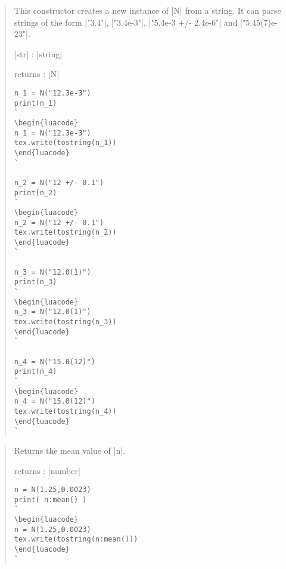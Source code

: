 \documentclass{ltxdoc}
\begin{document}
\begin{quote}
  This constructor creates a new instance of |N| from a string. It can parse strings of the form |"3.4"|, |"3.4e-3"|, |"5.4e-3 +/- 2.4e-6"| and |"5.45(7)e-23"|. 

  \begin{description}
  \item |str| : |string|

  \item returns : |N|
  \end{description}

\begin{lstlisting}
n_1 = N("12.3e-3")
print(n_1)
`
\begin{luacode}
n_1 = N("12.3e-3")
tex.write(tostring(n_1))
\end{luacode}
`

n_2 = N("12 +/- 0.1")
print(n_2)
`
\begin{luacode}
n_2 = N("12 +/- 0.1")
tex.write(tostring(n_2))
\end{luacode}
`

n_3 = N("12.0(1)")
print(n_3)
`
\begin{luacode}
n_3 = N("12.0(1)")
tex.write(tostring(n_3))
\end{luacode}
`

n_4 = N("15.0(12)")
print(n_4)
`
\begin{luacode}
n_4 = N("15.0(12)")
tex.write(tostring(n_4))
\end{luacode}
`
\end{lstlisting}
\end{quote}



\begin{quote}
  Returns the mean value of |n|.

  \subtitle{Parameters / Return}
  \begin{description}
  \item returns : |number|
  \end{description}

\begin{lstlisting}
n = N(1.25,0.0023)
print( n:mean() )
`
\begin{luacode}
n = N(1.25,0.0023)
tex.write(tostring(n:mean()))
\end{luacode}
`
\end{lstlisting}

\end{quote}
\end{document}
